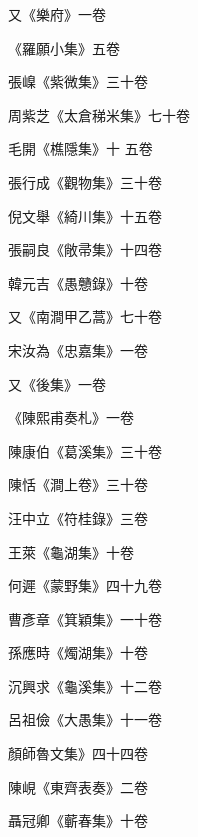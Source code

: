 \begin{pinyinscope}
 又《樂府》一卷



 《羅願小集》五卷



 張嵲《紫微集》三十卷



 周紫芝《太倉稊米集》七十卷



 毛開《樵隱集》十
 五卷



 張行成《觀物集》三十卷



 倪文舉《綺川集》十五卷



 張嗣良《敞帚集》十四卷



 韓元吉《愚戇錄》十卷



 又《南澗甲乙蒿》七十卷



 宋汝為《忠嘉集》一卷



 又《後集》一卷



 《陳熙甫奏札》一卷



 陳康伯《葛溪集》三十卷



 陳恬《澗上卷》三十卷



 汪中立《符桂錄》三卷



 王萊《龜湖集》十卷



 何遲《蒙野集》四十九卷



 曹彥章《箕穎集》一十卷



 孫應時《燭湖集》十卷



 沉興求《龜溪集》十二卷



 呂祖儉《大愚集》十一卷



 顏師魯文集》四十四卷



 陳峴《東齊表奏》二卷



 聶冠卿《蘄春集》十卷




\end{pinyinscope}
